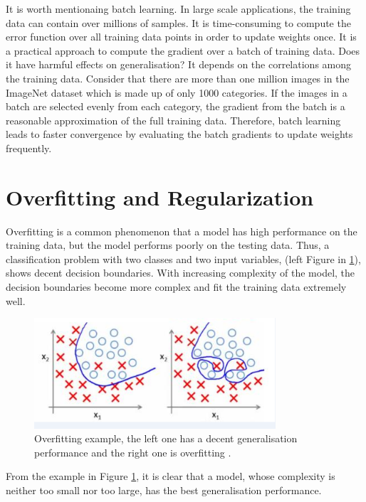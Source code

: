 It is worth mentionaing batch learning. In large scale applications, the training data can contain over millions of samples. It is time-consuming to compute the error function over all training data points in order to update weights once. It is a practical approach to compute the gradient over a batch of training data. Does it have harmful effects on generalisation? It depends on the correlations among the training data. Consider that there are more than one million images in the ImageNet dataset which is made up of only 1000 categories. If the images in a batch are selected evenly from each category, the gradient from the batch is a reasonable approximation of the full training data. Therefore, batch learning leads to faster convergence by evaluating the batch gradients to update weights frequently.

\section{Overfitting and Regularization}

Overfitting is a common phenomenon that a model has high performance on the training data, but the model performs poorly on the testing data. Thus, a classification problem with two classes and two input variables, (left Figure in \ref{fig:OverfittingExample}), shows decent decision boundaries. With increasing complexity of the model, the decision boundaries become more complex and fit the training data extremely well.
\graphicspath{ {./Figures/} }
\begin{figure}[!htb]
\centering
\includegraphics[width=0.8\textwidth]{overfitting.png}
\caption{\label{fig:OverfittingExample}Overfitting example, the left one has a decent generalisation performance and the right one is overfitting \citep{OverfittingFigure}.}
\end{figure}
From the example in Figure \ref{fig:OverfittingExample}, it is clear that a model, whose complexity is neither too small nor too large, has the best generalisation performance. 


